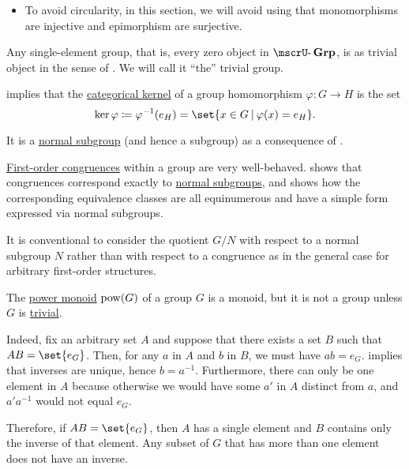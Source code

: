 \begin{definition}
\begin{thmenum}
\begin{itemize}
      \item To avoid circularity, in this section, we will avoid using that monomorphisms are injective and epimorphism are surjective.
    \end{itemize}

    \mimprovised Any single-element group, that is, every zero object in \( \ucat{Grp} \), is as trivial object in the sense of . We will call it \enquote{the} trivial group.

    \mimprovised {} implies that the \hyperref[def:zero_morphisms/kernel]{categorical kernel} of a group homomorphism \( \varphi: G \to H \) is the set
    \begin{equation*}
      \ker \varphi \coloneqq \varphi^{-1}(e_H) = \set{ x \in G \given \varphi(x) = e_H }.
    \end{equation*}

    It is a \hyperref[def:normal_subgroup]{normal subgroup} (and hence a subgroup) as a consequence of .

    \mimprovised \hyperref[def:first_order_congruence]{First-order congruences} within a group are very well-behaved.  shows that congruences correspond exactly to \hyperref[def:normal_subgroup]{normal subgroups}, and  shows how the corresponding equivalence classes are all equinumerous and have a simple form expressed via normal subgroups.

    It is conventional to consider the quotient \( G / N \) with respect to a normal subgroup \( N \) rather than with respect to a congruence as in the general case for arbitrary first-order structures.
  \end{thmenum}
\end{definition}

\begin{example}\label{ex:power_set_is_not_a_group}
  The \hyperref[ex:def:monoid/power]{power monoid} \( \operatorname{pow}(G) \) of a group \( G \) is a monoid, but it is not a group unless \( G \) is \hyperref[def:group/trivial]{trivial}.

  Indeed, fix an arbitrary set \( A \) and suppose that there exists a set \( B \) such that \( AB = \set{ e_G } \). Then, for any \( a \) in \( A \) and \( b \) in \( B \), we must have \( ab = e_G \).  implies that inverses are unique, hence \( b = a^{-1} \). Furthermore, there can only be one element in \( A \) because otherwise we would have some \( a' \) in \( A \) distinct from \( a \), and \( a' a^{-1} \) would not equal \( e_G \).

  Therefore, if \( AB = \set{ e_G } \), then \( A \) has a single element and \( B \) contains only the inverse of that element. Any subset of \( G \) that has more than one element does not have an inverse.
\end{example}

